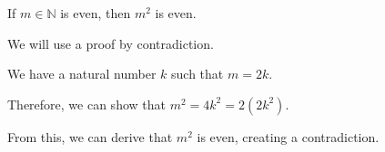 If $m \in \mathbb{N}$ is even, then $m^2$ is even.

We will use a proof by contradiction.

We have a natural number $k$ such that $m = 2k$.

Therefore, we can show that $m^2 = 4k^2 = 2(2k^2)$.

From this, we can derive that $m^2$ is even, creating a contradiction.